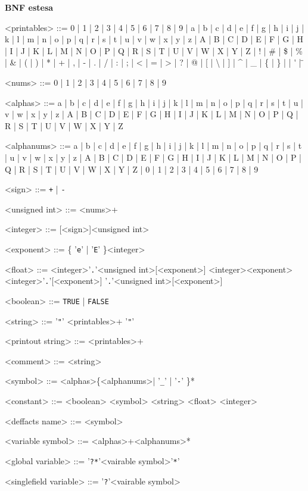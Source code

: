 {\textbf{BNF estesa}}
\begin{grammar}
{\large
<printables> ::=  0 | 1 | 2 | 3 | 4 | 5 | 6 | 7 | 8 | 9 | a | b | c | d | e | f | g | h | i | j | k | l | m | n | o | p | q | r | s | t | u | v | w | x | y | z | A | B | C | D | E | F | G | H | I | J | K | L | M | N | O | P | Q | R | S | T | U | V | W | X | Y | Z | ! | \# | \$ | \% | \& | ( | ) | * | + | , | - | . | / | : | ; | \textless{} | = | \textgreater{} | ? | @ | [ | \textbackslash{} | ] | \^{} | \_{} | \{ | \} | \texttildelow{} | \'{} | \"{}

<nums> ::=  0 | 1 | 2 | 3 | 4 | 5 | 6 | 7 | 8 | 9

<alphas> ::= a | b | c | d | e | f | g | h | i | j | k | l | m | n | o | p | q | r | s | t | u | v | w | x | y | z | A | B | C | D | E | F | G | H | I | J | K | L | M | N | O | P | Q | R | S | T | U | V | W | X | Y | Z

<alphanums> ::= a | b | c | d | e | f | g | h | i | j | k | l | m | n | o | p | q | r | s | t | u | v | w | x | y | z | A | B | C | D | E | F | G | H | I | J | K | L | M | N | O | P | Q | R | S | T | U | V | W | X | Y | Z | 0 | 1 | 2 | 3 | 4 | 5 | 6 | 7 | 8 | 9

<sign> ::= \verb!+! | \verb!-!

<unsigned int> ::= <nums>+

<integer> ::= [<sign>]<unsigned int>

<exponent> ::= \{ '\verb!e!' | '\verb!E!' \}<integer>

<float> ::= <integer>'\verb!.!'<unsigned int>[<exponent>]
 \alt <integer><exponent>
 \alt <integer>'\verb!.!'[<exponent>]
 \alt [<sign>]'\verb!.!'<unsigned int>[<exponent>]

<boolean> ::= \verb!TRUE! | \verb!FALSE!

<string> ::= '\verb!"!' <printables>+ '\verb!"!'

<printout string> ::= <printables>+

<comment> ::= <string>

<symbol> ::= <alphas>\{<alphanums>| '\verb!_!' | '\verb!-!' \}*

<constant> ::= <boolean>
\alt<symbol>
\alt<string>
\alt<float>
\alt<integer>

<deffacts name> ::= <symbol>

<variable symbol> ::= <alphas>+<alphanums>*

<global variable> ::= '\verb!?*!'<vairable symbol>'\verb!*!'

<singlefield variable> ::= '\verb!?!'<vairable symbol>

}
\end{grammar}
